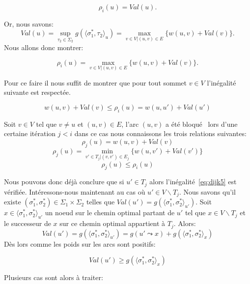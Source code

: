 \begin{enumerate}
$$ \rho_i(u) = Val(u) .$$

Or, nous savons: 
$$ Val(u) = \sup _{\tau_2 \in \Sigma_2 } g( \langle \sigma^*_1, \tau_2 \rangle_u) = \max_{v \in V | (u,v) \in E} \{ w(u,v) + Val(v) \} .$$
Nous allons donc montrer:

\begin{equation*}
	\rho_i(u) = \max_{v \in V | (u,v) \in E} \{ w(u,v) + Val(v) \}.
\end{equation*}

Pour ce faire il nous suffit de montrer que pour tout sommet $v \in V$ l'inégalité suivante est respectée.

\begin{equation}
	\label{eq:dijk5}
	w(u,v) + Val(v) \leq \rho_i(u) = w(u,u') + Val(u') 
\end{equation}

Soit $v \in V$ tel que $v \neq u$ et $(u,v) \in E$, l'arc $(u,v)$ a été \og bloqué \fg~lors d'une certaine itération $j < i $ dans ce cas nous connaissons les trois relations suivantes:
\begin{equation} \label{eq:dijk6}
	  \rho_j(u) = w(u,v) + Val(v) 
	\end{equation}
\begin{equation*}  \rho_j(u) = \min_{v' \in T_j |(v,v') \in E_j} \{ w(u,v') + Val(v') \} \end{equation*}
\begin{equation*} \rho_j(u) \leq \rho_i(u) \end{equation*}
	
Nous pouvons donc déjà conclure que si $u' \in T_j$ alors l'inégalité~\eqref{eq:dijk5} est vérifiée.
Intéressons-nous maintenant au cas où $u' \in V \backslash T_j$. Nous savons qu'il existe $(\sigma_1^*, \sigma_2^*)\! \in \Sigma_1 \times \Sigma_2$ telles que $Val(u') = g( \langle \sigma_1^*, \sigma_2^* \rangle_{u'})$. 
Soit $x \in \langle \sigma_1^*, \sigma_2^* \rangle_{u'}$ un noeud sur le chemin optimal partant de $u'$ tel que $x \in V\backslash T_j$ et le successeur de $x$ sur ce chemin optimal appartient à $T_j$.
Alors:
$$ Val(u') = g( \langle \sigma_1^*, \sigma_2^* \rangle_{u'}) = g(u' \leadsto x) + g( \langle \sigma_1^*, \sigma_2^* \rangle_{x}) $$
Dès lors comme les poids sur les arcs sont positifs:

\begin{equation*}
	Val(u') \geq g( \langle \sigma_1^*, \sigma_2^* \rangle_{x})
\end{equation*}

Plusieurs cas sont alors à traiter:


\end{enumerate}
